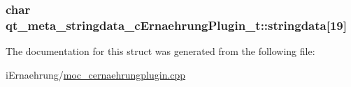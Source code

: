 \subsubsection[{\texorpdfstring{stringdata}{stringdata}}]{\setlength{\rightskip}{0pt plus 5cm}char qt\+\_\+meta\+\_\+stringdata\+\_\+c\+Ernaehrung\+Plugin\+\_\+t\+::stringdata\mbox{[}19\mbox{]}}\hypertarget{structqt__meta__stringdata__c_ernaehrung_plugin__t_adc7272a800db98fd08e9d093f108ea99}{}\label{structqt__meta__stringdata__c_ernaehrung_plugin__t_adc7272a800db98fd08e9d093f108ea99}


The documentation for this struct was generated from the following file\+:\begin{DoxyCompactItemize}
\item 
i\+Ernaehrung/\hyperlink{moc__cernaehrungplugin_8cpp}{moc\+\_\+cernaehrungplugin.\+cpp}\end{DoxyCompactItemize}
